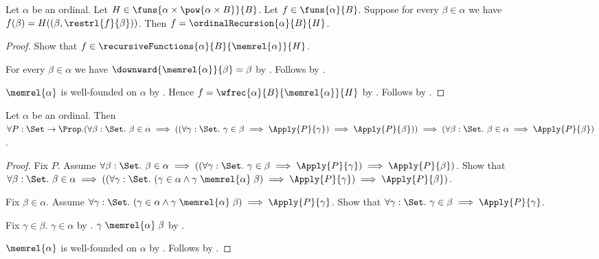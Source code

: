 \begin{theorem}\label{ordinal_recursion_unique}
    Let $\alpha$ be an ordinal.
    Let $H\in\funs{\alpha\times\pow{\alpha\times B}}{B}$.
    Let $f\in\funs{\alpha}{B}$.
    Suppose for every $\beta\in\alpha$ we have
        $f(\beta)=H((\beta,\restrl{f}{\beta}))$.
    Then $f=\ordinalRecursion{\alpha}{B}{H}$.
\end{theorem}
\begin{proof}
    Show that $f\in\recursiveFunctions{\alpha}{B}{\memrel{\alpha}}{H}$.
    \begin{subproof}
        For every $\beta\in\alpha$ we have
            $\downward{\memrel{\alpha}}{\beta}=\beta$
            by .
        Follows by .
    \end{subproof}
    $\memrel{\alpha}$ is well-founded on $\alpha$
        by .
    Hence $f=\wfrec{\alpha}{B}{\memrel{\alpha}}{H}$
        by .
    Follows by .
\end{proof}

\begin{theorem}\label{bounded_transfinite_induction}
    Let $\alpha$ be an ordinal.
    Then $\forall P:\Set\to\Prop.
        (\forall \beta:\Set.\ \beta\in\alpha\implies
            ((\forall \gamma:\Set.\ \gamma\in\beta\implies\Apply{P}{\gamma})
                \implies\Apply{P}{\beta}))
        \implies
        (\forall \beta:\Set.\ \beta\in\alpha\implies\Apply{P}{\beta})$.
\end{theorem}
\begin{proof}
    Fix $P$.
    Assume $\forall \beta:\Set.\ \beta\in\alpha\implies
        ((\forall \gamma:\Set.\ \gamma\in\beta\implies\Apply{P}{\gamma})
            \implies\Apply{P}{\beta})$.
    Show that $\forall \beta:\Set.\ \beta\in\alpha\implies
        ((\forall \gamma:\Set.\ (\gamma\in\alpha\land
                \gamma\mathrel{\memrel{\alpha}}\beta)
                \implies\Apply{P}{\gamma})
            \implies\Apply{P}{\beta})$.
    \begin{subproof}
        Fix $\beta\in\alpha$.
        Assume $\forall \gamma:\Set.\ (\gamma\in\alpha\land
                \gamma\mathrel{\memrel{\alpha}}\beta)
                \implies\Apply{P}{\gamma}$.
        Show that $\forall \gamma:\Set.\ \gamma\in\beta
            \implies\Apply{P}{\gamma}$.
        \begin{subproof}
            Fix $\gamma\in\beta$.
            $\gamma\in\alpha$ by .
            $\gamma\mathrel{\memrel{\alpha}}\beta$
                by .
        \end{subproof}
    \end{subproof}
    $\memrel{\alpha}$ is well-founded on $\alpha$
        by .
    Follows by .
\end{proof}
